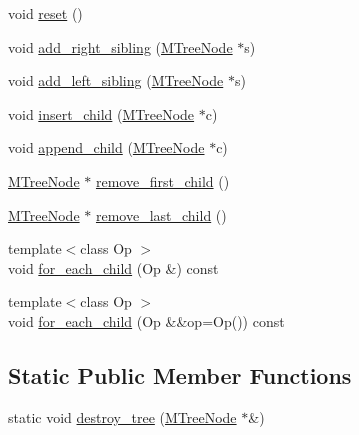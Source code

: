 \begin{DoxyCompactItemize}
\item 
void \hyperlink{class_designar_1_1_m_tree_node_a83e06dcf705a55bbf7a2963f7d95fdeb}{reset} ()
\item 
void \hyperlink{class_designar_1_1_m_tree_node_a7033b8c027740a78afd91813a77f6ece}{add\+\_\+right\+\_\+sibling} (\hyperlink{class_designar_1_1_m_tree_node}{M\+Tree\+Node} $\ast$s)
\item 
void \hyperlink{class_designar_1_1_m_tree_node_a393f9eb105d94c9a6cd13f09bead78aa}{add\+\_\+left\+\_\+sibling} (\hyperlink{class_designar_1_1_m_tree_node}{M\+Tree\+Node} $\ast$s)
\item 
void \hyperlink{class_designar_1_1_m_tree_node_a03c1d687b029121ab12d1f8f6ce5fe2f}{insert\+\_\+child} (\hyperlink{class_designar_1_1_m_tree_node}{M\+Tree\+Node} $\ast$c)
\item 
void \hyperlink{class_designar_1_1_m_tree_node_a3a78ef9097a315488694da92526b0bd1}{append\+\_\+child} (\hyperlink{class_designar_1_1_m_tree_node}{M\+Tree\+Node} $\ast$c)
\item 
\hyperlink{class_designar_1_1_m_tree_node}{M\+Tree\+Node} $\ast$ \hyperlink{class_designar_1_1_m_tree_node_a3923c9fceb148c7a4ad01c7e73360d50}{remove\+\_\+first\+\_\+child} ()
\item 
\hyperlink{class_designar_1_1_m_tree_node}{M\+Tree\+Node} $\ast$ \hyperlink{class_designar_1_1_m_tree_node_a4306d8860a10dabc42868e23d3871367}{remove\+\_\+last\+\_\+child} ()
\item 
{\footnotesize template$<$class Op $>$ }\\void \hyperlink{class_designar_1_1_m_tree_node_a50335e862976ee50c7d5958fdf717fc2}{for\+\_\+each\+\_\+child} (Op \&) const
\item 
{\footnotesize template$<$class Op $>$ }\\void \hyperlink{class_designar_1_1_m_tree_node_a6cb0e3e0b246cd11dee5017a5058f0b1}{for\+\_\+each\+\_\+child} (Op \&\&op=Op()) const
\end{DoxyCompactItemize}
\subsection*{Static Public Member Functions}
\begin{DoxyCompactItemize}
\item 
static void \hyperlink{class_designar_1_1_m_tree_node_a1cbf498a5d161f1cdb318295a4a9ec2e}{destroy\+\_\+tree} (\hyperlink{class_designar_1_1_m_tree_node}{M\+Tree\+Node} $\ast$\&)
\end{DoxyCompactItemize}


